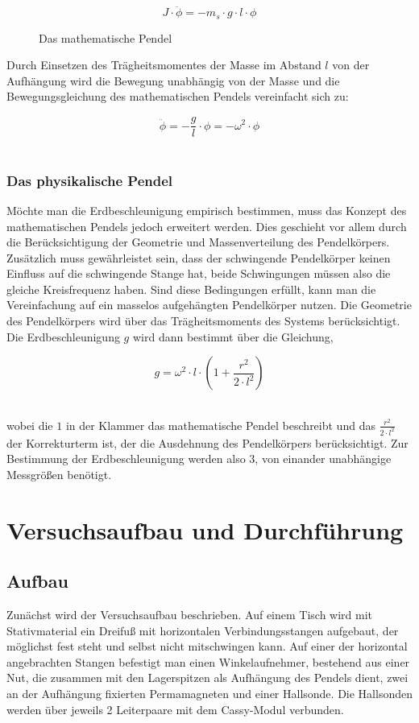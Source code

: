 \documentclass[a4paper, 11pt]{article}
\begin{document}
\begin{equation*}
J \cdot \ddot{\phi} = -m_s \cdot g \cdot l \cdot \phi
\end{equation*}

\begin{figure} [H]
\centering
	\caption{Das mathematische Pendel}
\end{figure}

Durch Einsetzen des Trägheitsmomentes der Masse im Abstand $l$ von der Aufhängung wird die Bewegung unabhängig von der Masse und die Bewegungsgleichung des mathematischen Pendels vereinfacht sich zu: 

\begin{equation*}
\ddot{\phi} = -\frac{g}{l} \cdot \phi = -\omega^2 \cdot \phi
\end{equation*}\

\subsubsection{Das physikalische Pendel}
Möchte man die Erdbeschleunigung empirisch bestimmen, muss das Konzept des mathematischen Pendels jedoch erweitert werden. Dies geschieht vor allem durch die Berücksichtigung der Geometrie und Massenverteilung des Pendelkörpers. Zusätzlich muss gewährleistet sein, dass der schwingende Pendelkörper keinen Einfluss auf die schwingende Stange hat, beide Schwingungen müssen also die gleiche Kreisfrequenz haben.
Sind diese Bedingungen erfüllt, kann man die Vereinfachung auf ein masselos aufgehängten Pendelkörper nutzen. Die Geometrie des Pendelkörpers wird über das Trägheitsmoments des Systems berücksichtigt. Die Erdbeschleunigung $g$ wird dann bestimmt über die Gleichung,

\begin{equation*}
g = \omega^2 \cdot l \cdot (1+\frac{r^2}{2 \cdot l^2})
\end{equation*}\

wobei die $1$ in der Klammer das mathematische Pendel beschreibt und das $\frac{r^2}{2 \cdot l^2}$ der Korrekturterm ist, der die Ausdehnung des Pendelkörpers berücksichtigt. Zur Bestimmung der Erdbeschleunigung werden also 3, von einander unabhängige Messgrößen benötigt.
\newpage

\section{Versuchsaufbau und Durchführung}
\subsection{Aufbau}
Zunächst wird der Versuchsaufbau beschrieben. Auf einem Tisch wird mit Stativmaterial ein Dreifuß mit horizontalen Verbindungsstangen aufgebaut, der möglichst fest steht und selbst nicht mitschwingen kann. Auf einer der horizontal angebrachten Stangen befestigt man einen Winkelaufnehmer, bestehend aus einer Nut, die zusammen mit den Lagerspitzen als Aufhängung des Pendels dient, zwei an der Aufhängung fixierten Permamagneten und einer Hallsonde. Die Hallsonden werden über jeweils 2 Leiterpaare mit dem Cassy-Modul verbunden.\\
\end{document}
